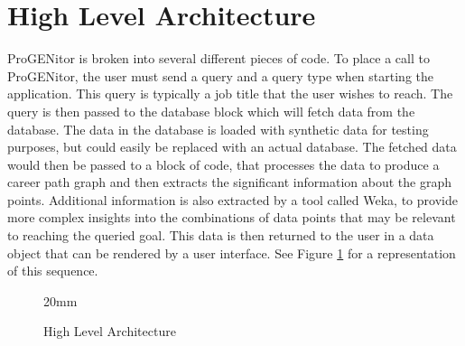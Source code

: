 \section{High Level Architecture}
\label{sect:high-level-architecture}
ProGENitor is broken into several different pieces of code.  To place a call
to ProGENitor, the user must send a query and a query type when starting the
application.  This query is typically a job title that the user wishes to reach.
The query is then passed to the database block which will fetch data from the
database.  The data in the database is loaded with synthetic data for testing
purposes, but could easily be replaced with an actual database. The fetched data
would then be passed to a block of code, that processes the data to produce a
career path graph and then extracts the significant information about the graph
points.  Additional information is also extracted by a tool called Weka, to
provide more complex insights into the combinations of data points that may be
relevant to reaching the queried goal.  This data is then returned to the user
in a data object that can be rendered by a user interface.  See Figure \ref{fig:HighLevelProjectArchitecture}
for a representation of this sequence.

\usetikzlibrary{shapes,arrows,chains}

\begin{figure}[H]
	\centering
  	\resizebox {!} {20mm} {
}

	\caption{High Level Architecture}
	\label{fig:HighLevelProjectArchitecture}
\end{figure}

